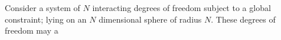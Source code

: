 Consider a system of $N$ interacting degrees of freedom subject to a global constraint; lying on an $N$ dimensional sphere of radius $N$. These degrees of freedom may a